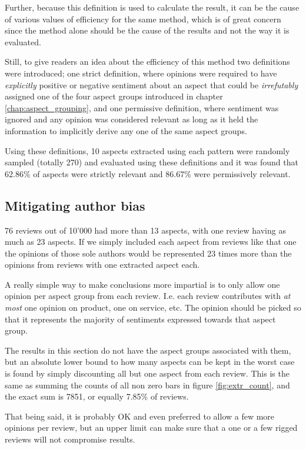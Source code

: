 \documentclass[a4paper,11pt]{kth-mag}
\begin{document}
Further, because this definition is used to calculate the result, it can be the cause of
various values of efficiency for the same method, which is of great concern
since the method alone should be the cause of the results and not the way it is evaluated.

Still, to give readers an idea about the efficiency of this method two definitions
were introduced; one strict definition, where opinions were required to have
\emph{explicitly} positive or negative sentiment about an aspect that could be
\emph{irrefutably} assigned one of the four aspect groups introduced in chapter \ref{chap:aspect_grouping},
and one permissive definition, where sentiment was ignored and any opinion was considered
relevant as long as it held the information to implicitly derive any one of the same aspect groups.

Using these definitions, 10 aspects extracted using each pattern were randomly sampled (totally 270)
and evaluated using these definitions  and it was found that 62.86\% of aspects were strictly relevant
and 86.67\% were permissively relevant.


\subsection{Mitigating author bias}
76 reviews out of 10'000 had more than 13 aspects, with one review having as much as 23 aspects.
If we simply included each aspect from reviews like that one the opinions of
those sole authors would be represented 23 times more than the opinions from reviews
with one extracted aspect each.

A really simple way to make conclusions more impartial is to only allow one
opinion per aspect group from each review.
I.e. each review contributes with \emph{at most} one opinion on product, one on service, etc.
The opinion should be picked so that it represents the majority of
sentiments expressed towards that aspect group.

The results in this section do not have the aspect groups associated with them,
but an absolute lower bound to how many aspects can be kept in the worst case
is found by simply discounting all but one aspect from each review. This is the same
as summing the counts of all non zero bars in figure \ref{fig:extr_count}, and the
exact sum is 7851, or equally 7.85\% of reviews.

That being said, it is probably OK and even preferred to allow a few more opinions per review,
but an upper limit can make sure that a one or a few rigged reviews will not compromise results.
\end{document}
